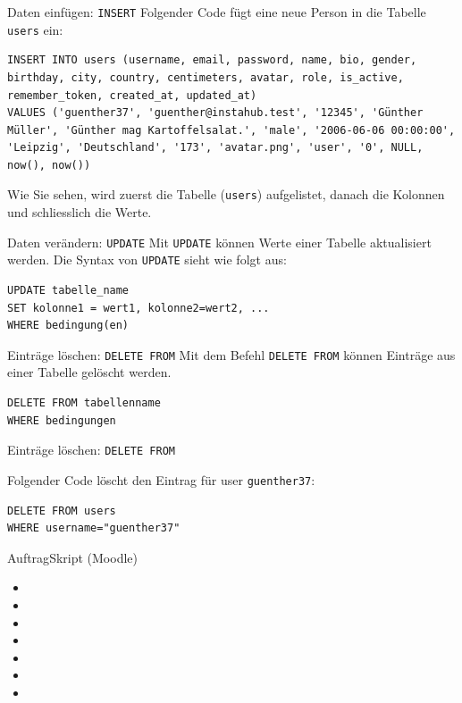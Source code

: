 \begin{frame}[fragile]{Daten einfügen: \texorpdfstring{\lstinline|INSERT|}{INSERT}}
Folgender Code fügt eine neue Person in die Tabelle \texttt{users} ein:
\begin{lstlisting}
INSERT INTO users (username, email, password, name, bio, gender, birthday, city, country, centimeters, avatar, role, is_active, remember_token, created_at, updated_at) 
VALUES ('guenther37', 'guenther@instahub.test', '12345', 'Günther Müller', 'Günther mag Kartoffelsalat.', 'male', '2006-06-06 00:00:00', 'Leipzig', 'Deutschland', '173', 'avatar.png', 'user', '0', NULL, now(), now())
\end{lstlisting}
Wie Sie sehen, wird zuerst die Tabelle (\texttt{users}) aufgelistet, danach die Kolonnen und schliesslich die Werte.
\end{frame}

\begin{frame}[fragile]{Daten verändern: \texorpdfstring{\lstinline|UPDATE|}{UPDATE}}
Mit \lstinline|UPDATE| können Werte einer Tabelle aktualisiert werden. Die Syntax von \lstinline|UPDATE| sieht wie folgt aus:

\begin{lstlisting}
UPDATE tabelle_name
SET kolonne1 = wert1, kolonne2=wert2, ...
WHERE bedingung(en)
\end{lstlisting}
\end{frame}

\begin{frame}[fragile]{Einträge löschen: \texorpdfstring{\lstinline|DELETE FROM|}{DELETE FROM}}
Mit dem Befehl \lstinline|DELETE FROM| können Einträge aus einer Tabelle gelöscht werden.
\begin{lstlisting}
DELETE FROM tabellenname
WHERE bedingungen
\end{lstlisting}

\end{frame}

\begin{frame}[fragile]{Einträge löschen: \texorpdfstring{\lstinline|DELETE FROM|}{DELETE FROM}}

Folgender Code löscht den Eintrag für user \texttt{guenther37}:
\begin{lstlisting}
DELETE FROM users
WHERE username="guenther37"
\end{lstlisting}
\end{frame}


\begin{frame}[fragile]{Auftrag}{Skript (Moodle)}
\begin{itemize}
	\item {}
	\item {}
	\item {}
	\item {}
	\item {}
	\item {}
	\item {}	
\end{itemize}
\end{frame}
